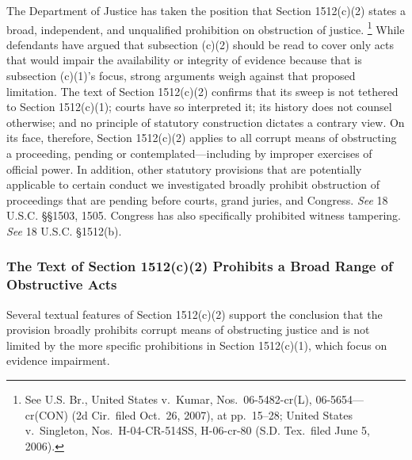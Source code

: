 The Department of Justice has taken the position that Section 1512(c)(2) states a broad, independent, and unqualified prohibition on obstruction of justice.%
\footnote{See U.S. Br., United States v.\ Kumar, Nos.~06-5482-cr(L), 06-5654—cr(CON) (2d Cir.\ filed Oct.~26, 2007), at pp.~15--28; United States v.\ Singleton, Nos.~H-04-CR-514SS, H-06-cr-80 (S.D. Tex.\ filed June 5, 2006).}
While defendants have argued that subsection (c)(2) should be read to cover only acts that would impair the availability or integrity of evidence because that is subsection (c)(1)’s focus, strong arguments weigh against that proposed limitation.
The text of Section 1512(c)(2) confirms that its sweep is not tethered to Section 1512(c)(1); courts have so interpreted it; its history does not counsel otherwise; and no principle of statutory construction dictates a contrary view.
On its face, therefore, Section 1512(c)(2) applies to all corrupt means of obstructing a proceeding, pending or contemplated---including by improper exercises of official power.
In addition, other statutory provisions that are potentially applicable to certain conduct we investigated broadly prohibit obstruction of proceedings that are pending before courts, grand juries, and Congress.
\textit{See} 18 U.S.C. \S\S 1503, 1505.
Congress has also specifically prohibited witness tampering.
\textit{See} 18 U.S.C. \S 1512(b).

\subsubsection{The Text of Section 1512(c)(2) Prohibits a Broad Range of Obstructive Acts}

Several textual features of Section 1512(c)(2) support the conclusion that the provision broadly prohibits corrupt means of obstructing justice and is not limited by the more specific prohibitions in Section 1512(c)(1), which focus on evidence impairment.

